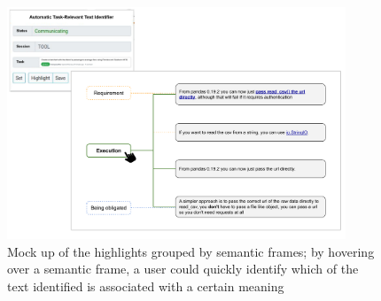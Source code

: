 \begin{figure}
    \centering
    \includegraphics[width=0.90\textwidth]{fig/cp7/semantic-cues}
    \caption{Mock up of the highlights grouped by semantic frames; by hovering over a semantic frame, a user could quickly identify which of the text identified is associated with a certain meaning}
    \label{fig:semantic-cues}
\end{figure}





